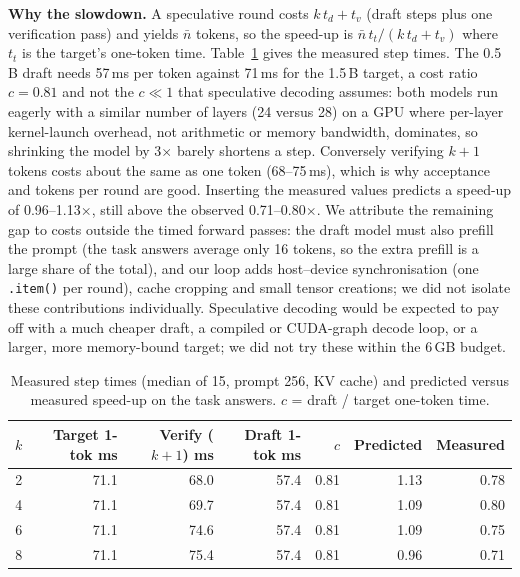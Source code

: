 \textbf{Why the slowdown.} A speculative round costs $k\,t_d + t_v$ (draft steps plus one verification pass) and yields $\bar n$ tokens, so the speed-up is $\bar n\,t_t/(k\,t_d+t_v)$ where $t_t$ is the target's one-token time. Table~\ref{tab:stepcost} gives the measured step times. The 0.5\,B draft needs 57\,ms per token against 71\,ms for the 1.5\,B target, a cost ratio $c=0.81$ and not the $c\ll1$ that speculative decoding assumes: both models run eagerly with a similar number of layers (24 versus 28) on a GPU where per-layer kernel-launch overhead, not arithmetic or memory bandwidth, dominates, so shrinking the model by 3$\times$ barely shortens a step. Conversely verifying $k+1$ tokens costs about the same as one token (68--75\,ms), which is why acceptance and tokens per round are good. Inserting the measured values predicts a speed-up of 0.96--1.13$\times$, still above the observed 0.71--0.80$\times$. We attribute the remaining gap to costs outside the timed forward passes: the draft model must also prefill the prompt (the task answers average only 16 tokens, so the extra prefill is a large share of the total), and our loop adds host--device synchronisation (one \texttt{.item()} per round), cache cropping and small tensor creations; we did not isolate these contributions individually. Speculative decoding would be expected to pay off with a much cheaper draft, a compiled or CUDA-graph decode loop, or a larger, more memory-bound target; we did not try these within the 6\,GB budget.

\begin{table}[t]
\caption{Measured step times (median of 15, prompt 256, KV cache) and predicted versus measured speed-up on the task answers. $c$ = draft / target one-token time.}
\label{tab:stepcost}
\centering\footnotesize
\begin{tabular}{rrrrrrr}
\hline
$k$ & Target 1-tok ms & Verify ($k+1$) ms & Draft 1-tok ms & $c$ & Predicted & Measured \\
\hline
2 & 71.1 & 68.0 & 57.4 & 0.81 & 1.13 & 0.78 \\
4 & 71.1 & 69.7 & 57.4 & 0.81 & 1.09 & 0.80 \\
6 & 71.1 & 74.6 & 57.4 & 0.81 & 1.09 & 0.75 \\
8 & 71.1 & 75.4 & 57.4 & 0.81 & 0.96 & 0.71 \\
\hline
\end{tabular}
\end{table}

